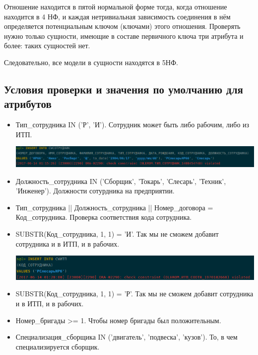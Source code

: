 Отношение находится в пятой нормальной форме тогда, когда отношение находится в 4 НФ, и каждая нетривиальная зависимость соединения в нём определяется потенциальным ключом (ключами) этого отношения.
Проверять нужно только сущности, имеющие в составе первичного ключа три атрибута и более: таких сущностей нет.

Следовательно, все модели в сущности находятся в 5НФ.

\subsection{Условия проверки и значения по умолчанию для атрибутов}

\begin{itemize}

    \item Тип\_сотрудника IN ('Р', 'И'). Сотрудник может быть либо рабочим, либо из ИТП.

    \includegraphics[width=17cm]{./screenshots/constraints/employee1.png}

    \item Должность\_сотрудника IN ('Сборщик', 'Токарь', 'Слесарь', 'Техник', 'Инженер').
    Должности сотурдника на предприятии.

    \item Тип\_сотрудника || Должность\_сотрудника || Номер\_договора = Код\_сотрудника.
    Проверка соответствия кода сотрудника.

    \item  SUBSTR(Код\_сотрудника, 1, 1) = 'И'.
    Так мы не сможем добавит сотрудника и в ИТП, и в рабочих.

    \includegraphics[width=17cm]{./screenshots/constraints/itp.png}

    \item SUBSTR(Код\_сотрудника, 1, 1) = 'Р'.
    Так мы не сможем добавит сотрудника и в ИТП, и в рабочих.

    \item Номер\_бригады >= 1.
    Чтобы номер бригады был положительным.

    \item Специализация\_сборщика IN ('двигатель', 'подвеска', 'кузов').
    То, в чем специализируется сборщик.


\end{itemize}
